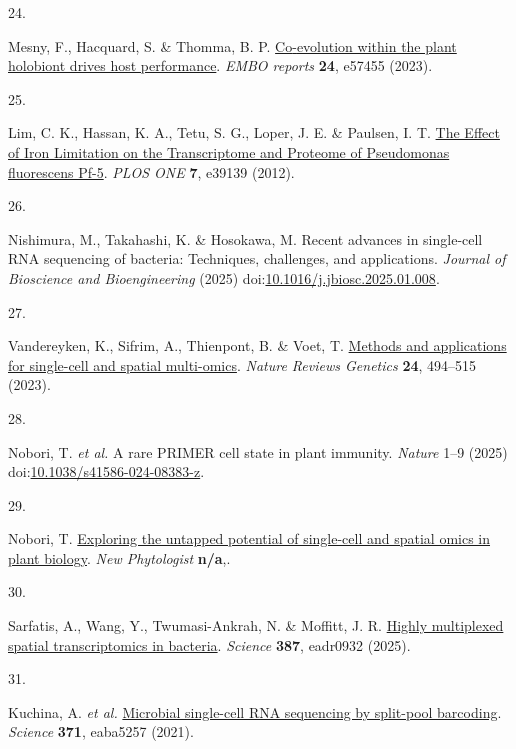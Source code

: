 \documentclass[
  11pt,
  a4paper,
]{report}
\newlength{\cslhangindent}
\newlength{\csllabelwidth}
\newenvironment{CSLReferences}[2] %
 {\begin{list}{}{%
  \setlength{\itemindent}{0pt}
  \setlength{\leftmargin}{0pt}
  \setlength{\parsep}{0pt}
  \ifodd #1
   \setlength{\leftmargin}{\cslhangindent}
   \setlength{\itemindent}{-1\cslhangindent}
  \fi
  \setlength{\itemsep}{#2\baselineskip}}}
 {\end{list}}
\newcommand{\CSLLeftMargin}[1]{\parbox[t]{\csllabelwidth}{\strut#1\strut}}
\newcommand{\CSLRightInline}[1]{\parbox[t]{\linewidth - \csllabelwidth}{\strut#1\strut}}
\begin{document}
\begin{CSLReferences}{0}{0}
\CSLLeftMargin{24. }%
\CSLRightInline{Mesny, F., Hacquard, S. \& Thomma, B. P.
\href{https://doi.org/10.15252/embr.202357455}{Co{-}evolution within the
plant holobiont drives host performance}. \emph{EMBO reports}
\textbf{24}, e57455 (2023).}

\CSLLeftMargin{25. }%
\CSLRightInline{Lim, C. K., Hassan, K. A., Tetu, S. G., Loper, J. E. \&
Paulsen, I. T. \href{https://doi.org/10.1371/journal.pone.0039139}{The
Effect of Iron Limitation on the Transcriptome and Proteome of
Pseudomonas fluorescens Pf-5}. \emph{PLOS ONE} \textbf{7}, e39139
(2012).}

\CSLLeftMargin{26. }%
\CSLRightInline{Nishimura, M., Takahashi, K. \& Hosokawa, M. Recent
advances in single-cell RNA sequencing of bacteria: Techniques,
challenges, and applications. \emph{Journal of Bioscience and
Bioengineering} (2025)
doi:\href{https://doi.org/10.1016/j.jbiosc.2025.01.008}{10.1016/j.jbiosc.2025.01.008}.}

\CSLLeftMargin{27. }%
\CSLRightInline{Vandereyken, K., Sifrim, A., Thienpont, B. \& Voet, T.
\href{https://doi.org/10.1038/s41576-023-00580-2}{Methods and
applications for single-cell and spatial multi-omics}. \emph{Nature
Reviews Genetics} \textbf{24}, 494--515 (2023).}

\CSLLeftMargin{28. }%
\CSLRightInline{Nobori, T. \emph{et al.} A rare PRIMER cell state in
plant immunity. \emph{Nature} 1--9 (2025)
doi:\href{https://doi.org/10.1038/s41586-024-08383-z}{10.1038/s41586-024-08383-z}.}

\CSLLeftMargin{29. }%
\CSLRightInline{Nobori, T.
\href{https://doi.org/10.1111/nph.70220}{Exploring the untapped
potential of single-cell and spatial omics in plant biology}. \emph{New
Phytologist} \textbf{n/a},.}

\CSLLeftMargin{30. }%
\CSLRightInline{Sarfatis, A., Wang, Y., Twumasi-Ankrah, N. \& Moffitt,
J. R. \href{https://doi.org/10.1126/science.adr0932}{Highly multiplexed
spatial transcriptomics in bacteria}. \emph{Science} \textbf{387},
eadr0932 (2025).}

\CSLLeftMargin{31. }%
\CSLRightInline{Kuchina, A. \emph{et al.}
\href{https://doi.org/10.1126/science.aba5257}{Microbial single-cell RNA
sequencing by split-pool barcoding}. \emph{Science} \textbf{371},
eaba5257 (2021).}


\end{CSLReferences}
\end{document}
